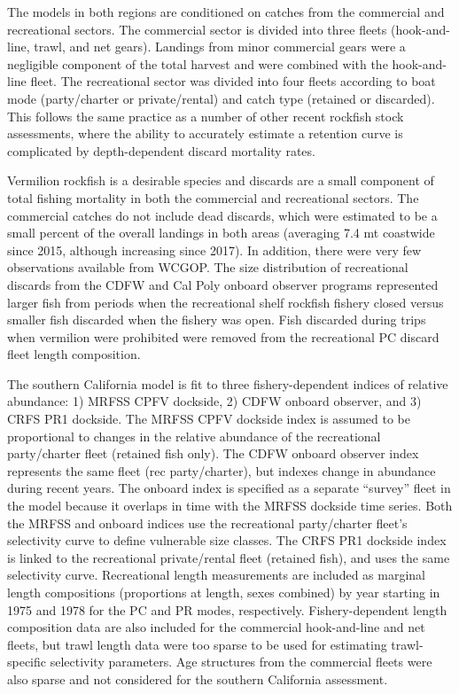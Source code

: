 \documentclass[11pt,
  english,
  a4paper,
]{article}
\begin{document}
The models in both regions are conditioned on catches from the commercial and recreational sectors. The commercial sector is divided into three fleets (hook-and-line, trawl, and net gears). Landings from minor commercial gears were a negligible component of the total harvest and were combined with the hook-and-line fleet. The recreational sector was divided into four fleets according to boat mode (party/charter or private/rental) and catch type (retained or discarded). This follows the same practice as a number of other recent rockfish stock assessments, where the ability to accurately estimate a retention curve is complicated by depth-dependent discard mortality rates.

Vermilion rockfish is a desirable species and discards are a small component of total fishing mortality in both the commercial and recreational sectors. The commercial catches do not include dead discards, which were estimated to be a small percent of the overall landings in both areas (averaging 7.4 mt coastwide since 2015, although increasing since 2017). In addition, there were very few observations available from WCGOP. The size distribution of recreational discards from the CDFW and Cal Poly onboard observer programs represented larger fish from periods when the recreational shelf rockfish fishery closed versus smaller fish discarded when the fishery was open. Fish discarded during trips when vermilion were prohibited were removed from the recreational PC discard fleet length composition.

The southern California model is fit to three fishery-dependent indices of relative abundance: 1) MRFSS CPFV dockside, 2) CDFW onboard observer, and 3) CRFS PR1 dockside. The MRFSS CPFV dockside index is assumed to be proportional to changes in the relative abundance of the recreational party/charter fleet (retained fish only). The CDFW onboard observer index represents the same fleet (rec party/charter), but indexes change in abundance during recent years. The onboard index is specified as a separate ``survey'' fleet in the model because it overlaps in time with the MRFSS dockside time series. Both the MRFSS and onboard indices use the recreational party/charter fleet's selectivity curve to define vulnerable size classes. The CRFS PR1 dockside index is linked to the recreational private/rental fleet (retained fish), and uses the same selectivity curve. Recreational length measurements are included as marginal length compositions (proportions at length, sexes combined) by year starting in 1975 and 1978 for the PC and PR modes, respectively. Fishery-dependent length composition data are also included for the commercial hook-and-line and net fleets, but trawl length data were too sparse to be used for estimating trawl-specific selectivity parameters. Age structures from the commercial fleets were also sparse and not considered for the southern California assessment.
\end{document}
